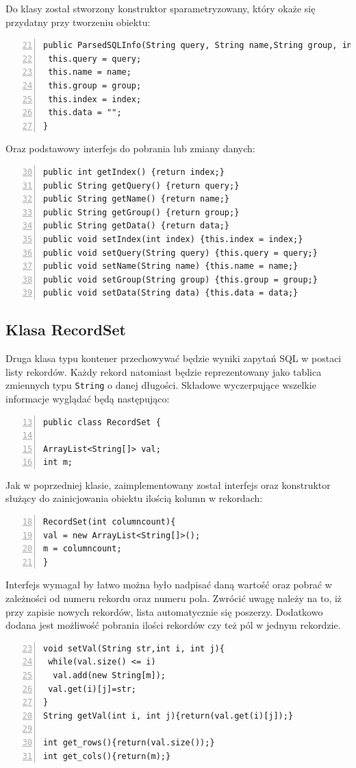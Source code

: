 Do klasy został stworzony konstruktor sparametryzowany, który okaże się przydatny przy tworzeniu obiektu:
   
\begin{lstlisting}[numbers=left,firstnumber=21]
public ParsedSQLInfo(String query, String name,String group, int index) {
 this.query = query;
 this.name = name;
 this.group = group;
 this.index = index;
 this.data = "";
}
\end{lstlisting}

Oraz podstawowy interfejs do  pobrania lub zmiany danych:
\begin{lstlisting}[numbers=left,firstnumber=30]
public int getIndex() {return index;}
public String getQuery() {return query;}
public String getName() {return name;}
public String getGroup() {return group;}
public String getData() {return data;}
public void setIndex(int index) {this.index = index;}
public void setQuery(String query) {this.query = query;}
public void setName(String name) {this.name = name;}
public void setGroup(String group) {this.group = group;}
public void setData(String data) {this.data = data;}
\end{lstlisting}

\subsection{Klasa RecordSet}
Druga klasa typu kontener przechowywać będzie wyniki zapytań SQL w postaci listy rekordów. Każdy rekord natomiast będzie reprezentowany jako tablica zmiennych typu \texttt{String} o danej długości. Składowe wyczerpujące wszelkie informacje wyglądać będą następująco:

\begin{lstlisting}[numbers=left,firstnumber=13]
public class RecordSet {

ArrayList<String[]> val;
int m;
\end{lstlisting}

Jak w poprzedniej klasie, zaimplementowany został interfejs oraz konstruktor służący do zainicjowania obiektu ilością kolumn w rekordach:
 \begin{lstlisting}[numbers=left,firstnumber=18]
RecordSet(int columncount){
val = new ArrayList<String[]>();
m = columncount;
}
 \end{lstlisting}

Interfejs wymagał by łatwo można było nadpisać daną wartość oraz pobrać w zależności od numeru rekordu oraz numeru pola. Zwrócić uwagę należy na to, iż przy zapisie nowych rekordów, lista automatycznie się poszerzy. Dodatkowo dodana jest możliwość pobrania ilości rekordów czy też pól w jednym rekordzie.
 \begin{lstlisting}[numbers=left,firstnumber=23]
void setVal(String str,int i, int j){
 while(val.size() <= i)
  val.add(new String[m]);
 val.get(i)[j]=str;
}
String getVal(int i, int j){return(val.get(i)[j]);}   

int get_rows(){return(val.size());}
int get_cols(){return(m);}
\end{lstlisting}

